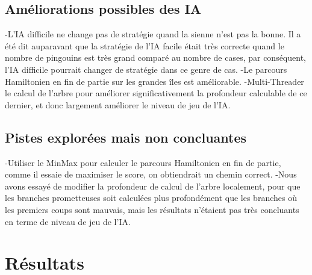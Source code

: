 \documentclass{report}
\begin{document}
\section{Améliorations possibles des IA}

-L'IA difficile ne change pas de stratégie quand la sienne n'est pas la bonne. Il a été dit auparavant que la stratégie de l'IA facile était très correcte quand le nombre de pingouins est très grand comparé au nombre de cases, par conséquent, l'IA difficile pourrait changer de stratégie dans ce genre de cas.
\newline
-Le parcours Hamiltonien en fin de partie sur les grandes îles est améliorable.
\newline 
-Multi-Threader le calcul de l'arbre pour améliorer significativement la profondeur calculable de ce dernier, et donc largement améliorer le niveau de jeu de l'IA.

\section{Pistes explorées mais non concluantes}
-Utiliser le MinMax pour calculer le parcours Hamiltonien en fin de partie, comme il essaie de maximiser le score, on obtiendrait un chemin correct.
\newline
-Nous avons essayé de modifier la profondeur de calcul de l'arbre localement, pour que les branches prometteuses soit calculées plus profondément que les branches où les premiers coups sont mauvais, mais les résultats n’étaient pas très concluants en terme de niveau de jeu de l'IA.

\chapter{Résultats}
\end{document}
